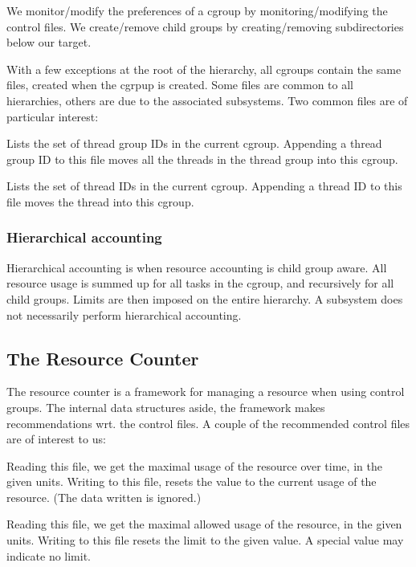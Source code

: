 We monitor/modify the preferences of a cgroup by monitoring/modifying the
control files. We create/remove child groups by creating/removing
subdirectories below our target.

With a few exceptions at the root of the hierarchy, all cgroups contain the
same files, created when the cgrpup is created. Some files are common to all
hierarchies, others are due to the associated subsystems. Two common files are
of particular interest:

\begin{description}[\setleftmargin{0.2in}\breaklabel\setlabelstyle{\tt}]

\item [cgroup.procs] Lists the set of thread group IDs in the current cgroup.
Appending a thread group ID to this file moves all the threads in the thread
group into this cgroup.

\item [tasks] Lists the set of thread IDs in the current cgroup. Appending a
thread ID to this file moves the thread into this cgroup.

\end{description}

\subsubsection{Hierarchical accounting}

Hierarchical accounting is when resource accounting is child group aware. All
resource usage is summed up for all tasks in the cgroup, and recursively
for all child groups. Limits are then imposed on the entire hierarchy. A
subsystem does not necessarily perform hierarchical accounting.

\subsection{The Resource Counter}

\label{section:cgroups:resource-counter}

The resource counter is a framework for managing a resource when using control
groups\cite{resource-counter.txt}.  The internal data structures aside, the
framework makes recommendations wrt. the control files. A couple of the
recommended control files are of interest to us:

\begin{description}[\setleftmargin{0.2in}\breaklabel\setlabelstyle{\tt}]

\item[<resource>.max\_usage\_in\_<unit\_of\_measurement>] Reading this file, we
get the maximal usage of the resource over time, in the given units. Writing to
this file, resets the value to the current usage of the resource. (The data
written is ignored.)

\item[<resource>.limit\_in\_<unit\_of\_measurement>] Reading this file, we get
the maximal allowed usage of the resource, in the given units. Writing to this
file resets the limit to the given value. A special value may indicate no
limit.

\end{description}

